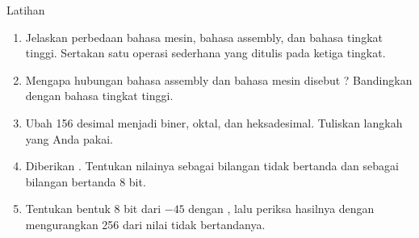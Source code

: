 \documentclass[aspectratio=169,11pt]{beamer}
\begin{document}
\begin{frame}{Latihan}
\small
\begin{enumerate}
    \item Jelaskan perbedaan bahasa mesin, bahasa assembly, dan bahasa
          tingkat tinggi. Sertakan satu operasi sederhana yang ditulis
          pada ketiga tingkat.

    \vspace{0.18em}
    \item Mengapa hubungan bahasa assembly dan bahasa mesin disebut
          ? Bandingkan dengan bahasa tingkat tinggi.

    \vspace{0.18em}
    \item Ubah 156 desimal menjadi biner, oktal, dan heksadesimal.
          Tuliskan langkah yang Anda pakai.

    \vspace{0.18em}
    \item Diberikan . Tentukan nilainya sebagai
          bilangan tidak bertanda dan sebagai bilangan bertanda 8 bit.

    \vspace{0.18em}
    \item Tentukan bentuk 8 bit dari $-45$ dengan
          , lalu periksa hasilnya dengan
          mengurangkan 256 dari nilai tidak bertandanya.
\end{enumerate}
\end{frame}
\end{document}
